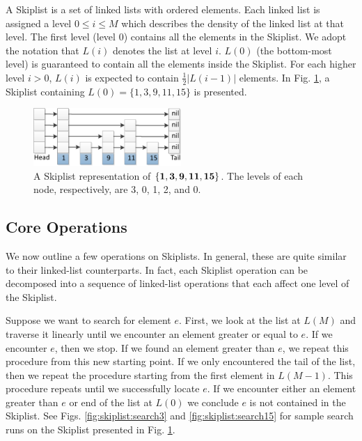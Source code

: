 \documentclass{acm_proc_article-sp}
\begin{document}
A Skiplist is a set of linked lists with ordered elements.
Each linked list is assigned a level $0 \leq i \leq M$ which describes
the density of the linked list at that level. The first
level (level 0) contains all the elements in the Skiplist.  We
adopt the notation that $L(i)$ denotes the list at level
$i$. $L(0)$ (the bottom-most level) is guaranteed to 
contain all the elements inside the Skiplist. For each higher level
$i > 0$, $L(i)$
is expected to contain $\frac{1}{2}|L(i-1)|$ elements.
In Fig. \ref{fig:skiplist}, a Skiplist containing
$L(0) = \{1,3,9,11,15\}$ is presented.

\begin{figure}[H]
  \includegraphics[width=0.5\textwidth]{img/skiplist-crop.pdf}
  \caption{A Skiplist representation of $\bf \{1,3,9,11,15\}$. The levels of
each node, respectively, are 3, 0, 1, 2, and 0.}
  \label{fig:skiplist}
\end{figure}

\subsection{Core Operations}

We now outline a few operations on Skiplists. In general, these are
quite similar to their linked-list counterparts. In fact, each Skiplist
operation can be decomposed into a sequence of linked-list operations that
each affect
one level of the Skiplist.

Suppose we want to search for element $e$. First,
we look at the list at $L(M)$ and traverse it linearly until we encounter
an element greater or equal to $e$.  If we encounter $e$, then we stop.
If we found an element greater than $e$, we repeat this procedure from
this new starting point. If we only encountered the tail of the list, then we
repeat the procedure starting from the first element in $L(M-1)$. This procedure
repeats until we successfully locate $e$. If we encounter either an element
greater than $e$ or end of the list at $L(0)$ we conclude $e$ is
not contained in the Skiplist. See Figs. \ref{fig:skiplist:search3} and \ref{fig:skiplist:search15}
for sample search runs on the Skiplist presented in Fig. \ref{fig:skiplist}.
\end{document}
